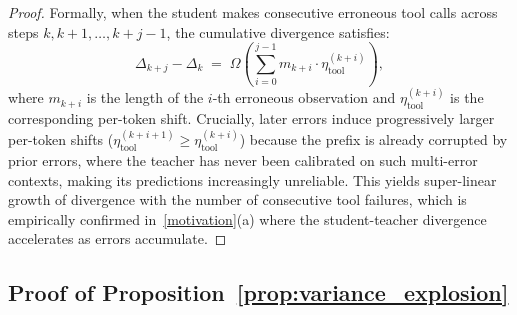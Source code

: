 \begin{proof}
Formally, when the student makes consecutive erroneous tool calls across steps $k, k+1, \ldots, k+j-1$, the cumulative divergence satisfies:
\begin{equation}
    \Delta_{k+j} - \Delta_k \;=\; \Omega\!\left(\sum_{i=0}^{j-1} m_{k+i} \cdot \eta_{\mathrm{tool}}^{(k+i)}\right),
\end{equation}
where $m_{k+i}$ is the length of the $i$-th erroneous observation and $\eta_{\mathrm{tool}}^{(k+i)}$ is the corresponding per-token shift. Crucially, later errors induce progressively larger per-token shifts ($\eta_{\mathrm{tool}}^{(k+i+1)} \ge \eta_{\mathrm{tool}}^{(k+i)}$) because the prefix is already corrupted by prior errors, where the teacher has never been calibrated on such multi-error contexts, making its predictions increasingly unreliable. This yields super-linear growth of divergence with the number of consecutive tool failures, which is empirically confirmed in~\cref{motivation}(a) where the student-teacher divergence accelerates as errors accumulate.
\end{proof}

\subsection{Proof of Proposition~\ref{prop:variance_explosion}}

